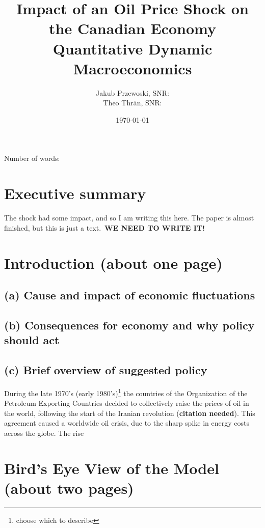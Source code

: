 \documentclass[12pt]{article}
\title{\textbf{Impact of an Oil Price Shock on the Canadian Economy} \\ \large{Quantitative Dynamic Macroeconomics}}
\author{Jakub Przewoski, SNR: \\ Theo Thrän, SNR: }
\date{\today}
\begin{document}
\maketitle
\vfill{}
\begin{center}
    \large
    Number of words:
\end{center}
\newpage

\section{Executive summary}
The shock had some impact, and so I am writing this here. The paper is almost finished, but this is just a text.\ \textbf{WE NEED TO WRITE IT!}

\newpage
\section{Introduction (about one page)}
\subsection*{(a) Cause and impact of economic fluctuations}

\subsection*{(b) Consequences for economy and why policy should act}

\subsection*{(c) Brief overview of suggested policy}

During the late 1970's (early 1980's)\footnote{choose which to describe} the countries of the Organization of the Petroleum Exporting Countries decided to collectively raise the prices of oil in the world, following the start of the Iranian revolution (\textbf{citation needed}). This agreement caused a worldwide oil crisis, due to the sharp spike in energy costs across the globe. The rise



\newpage
\section{Bird’s Eye View of the Model (about two pages)}
\end{document}
